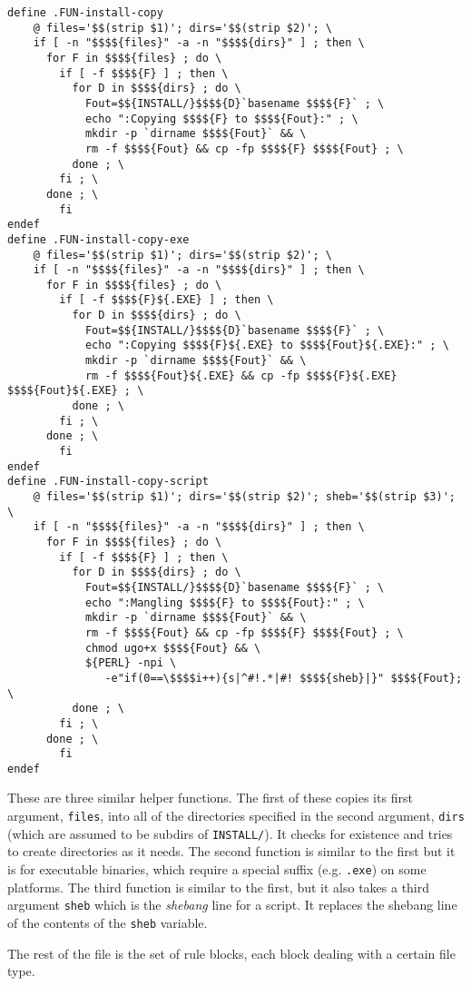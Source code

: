 \documentclass[letterpaper]{article}
\begin{document}
\begin{verbatim}
define .FUN-install-copy
	@ files='$$(strip $1)'; dirs='$$(strip $2)'; \
	if [ -n "$$$${files}" -a -n "$$$${dirs}" ] ; then \
	  for F in $$$${files} ; do \
	    if [ -f $$$${F} ] ; then \
	      for D in $$$${dirs} ; do \
	        Fout=$${INSTALL/}$$$${D}`basename $$$${F}` ; \
	        echo ":Copying $$$${F} to $$$${Fout}:" ; \
	        mkdir -p `dirname $$$${Fout}` && \
	        rm -f $$$${Fout} && cp -fp $$$${F} $$$${Fout} ; \
	      done ; \
	    fi ; \
	  done ; \
        fi
endef
define .FUN-install-copy-exe
	@ files='$$(strip $1)'; dirs='$$(strip $2)'; \
	if [ -n "$$$${files}" -a -n "$$$${dirs}" ] ; then \
	  for F in $$$${files} ; do \
	    if [ -f $$$${F}${.EXE} ] ; then \
	      for D in $$$${dirs} ; do \
	        Fout=$${INSTALL/}$$$${D}`basename $$$${F}` ; \
	        echo ":Copying $$$${F}${.EXE} to $$$${Fout}${.EXE}:" ; \
	        mkdir -p `dirname $$$${Fout}` && \
	        rm -f $$$${Fout}${.EXE} && cp -fp $$$${F}${.EXE} $$$${Fout}${.EXE} ; \
	      done ; \
	    fi ; \
	  done ; \
        fi
endef
define .FUN-install-copy-script
	@ files='$$(strip $1)'; dirs='$$(strip $2)'; sheb='$$(strip $3)'; \
	if [ -n "$$$${files}" -a -n "$$$${dirs}" ] ; then \
	  for F in $$$${files} ; do \
	    if [ -f $$$${F} ] ; then \
	      for D in $$$${dirs} ; do \
	        Fout=$${INSTALL/}$$$${D}`basename $$$${F}` ; \
	        echo ":Mangling $$$${F} to $$$${Fout}:" ; \
	        mkdir -p `dirname $$$${Fout}` && \
	        rm -f $$$${Fout} && cp -fp $$$${F} $$$${Fout} ; \
	        chmod ugo+x $$$${Fout} && \
	        ${PERL} -npi \
	           -e"if(0==\$$$$i++){s|^#!.*|#! $$$${sheb}|}" $$$${Fout}; \
	      done ; \
	    fi ; \
	  done ; \
        fi
endef
\end{verbatim}
These are three similar helper functions.
The first of these copies its first
argument, \verb+files+, into all of the directories specified in the
second argument, \verb+dirs+ (which are assumed to be subdirs of
\verb+INSTALL/+).  It checks for existence and tries to create
directories as it needs.  The second function is similar to the first
but it is for executable binaries, which require a special suffix
(e.g. \verb+.exe+) on some platforms.  The third function is similar to the
first, but it also takes a third argument \verb+sheb+ which is the
{\em shebang} line for a script.  It replaces the shebang line of the
contents of the \verb+sheb+ variable.

The rest of the file is the set of rule blocks, each block dealing with
a certain file type.
\end{document}
